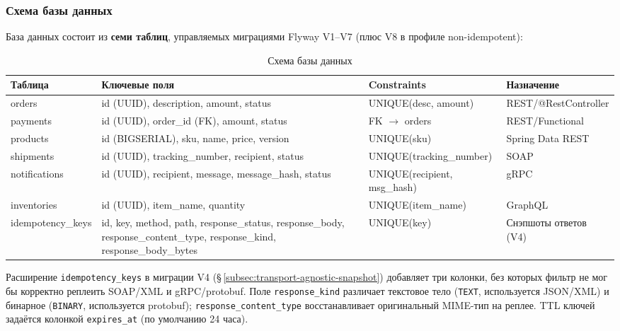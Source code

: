 \subsubsection{Схема базы данных}

База данных состоит из \textbf{семи таблиц}, управляемых миграциями Flyway V1--V7 (плюс V8 в профиле non-idempotent):

\begin{table}[H]
\centering
\caption{Схема базы данных}
\label{tab:db-schema}
\scriptsize
\begin{tabularx}{\textwidth}{@{}l X l l@{}}
\toprule
\textbf{Таблица} & \textbf{Ключевые поля} & \textbf{Constraints} & \textbf{Назначение} \\
\midrule
orders            & id (UUID), description, amount, status                                                    & UNIQUE(desc, amount)            & REST/@RestController \\
payments          & id (UUID), order\_id (FK), amount, status                                                  & FK $\to$ orders                 & REST/Functional \\
products          & id (BIGSERIAL), sku, name, price, version                                                  & UNIQUE(sku)                     & Spring Data REST \\
shipments         & id (UUID), tracking\_number, recipient, status                                             & UNIQUE(tracking\_number)        & SOAP \\
notifications     & id (UUID), recipient, message, message\_hash, status                                       & UNIQUE(recipient, msg\_hash)    & gRPC \\
inventories       & id (UUID), item\_name, quantity                                                            & UNIQUE(item\_name)              & GraphQL \\
idempotency\_keys & id, key, method, path, response\_status, response\_body, response\_content\_type, response\_kind, response\_body\_bytes & UNIQUE(key) & Снэпшоты ответов (V4) \\
\bottomrule
\end{tabularx}
\end{table}

Расширение \texttt{idempotency\_keys} в миграции V4 (\S\,\ref{subsec:transport-agnostic-snapshot}) добавляет три колонки, без которых фильтр не мог бы корректно реплеить SOAP/XML и gRPC/protobuf. Поле \texttt{response\_kind} различает текстовое тело (\texttt{TEXT}, используется JSON/XML) и бинарное (\texttt{BINARY}, используется protobuf); \texttt{response\_content\_type} восстанавливает оригинальный MIME-тип на реплее. TTL ключей задаётся колонкой \texttt{expires\_at} (по умолчанию 24 часа).

